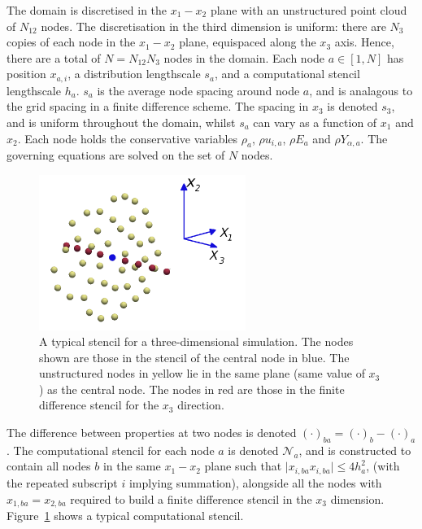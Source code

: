\documentclass[notitlepage]{revtex4-1}
\begin{document}
The domain is discretised in the $x_{1}-x_{2}$ plane with an unstructured point cloud of $N_{12}$ nodes. The discretisation in the third dimension is uniform: there are $N_{3}$ copies of each node in the $x_{1}-x_{2}$ plane, equispaced along the $x_{3}$ axis. Hence, there are a total of $N=N_{12}N_{3}$ nodes in the domain. Each node $a\in\left[1,N\right]$ has position $x_{a,i}$, a distribution lengthscale $s_{a}$, and a computational stencil lengthscale $h_{a}$. $s_{a}$ is the average node spacing around node $a$, and is analagous to the grid spacing in a finite difference scheme. The spacing in $x_{3}$ is denoted $s_{3}$, and is uniform throughout the domain, whilst $s_{a}$ can vary as a function of $x_{1}$ and $x_{2}$. Each node holds the conservative variables $\rho_{a}$, $\rho{u}_{i,a}$, $\rho{E}_{a}$ and $\rho{Y}_{\alpha,a}$. The governing equations are solved on the set of $N$ nodes. 

\begin{figure}
\includegraphics[width=0.6\textwidth]{./stencil.png}
\caption{A typical stencil for a three-dimensional simulation. The nodes shown are those in the stencil of the central node in blue. The unstructured nodes in yellow lie in the same plane (same value of $x_{3}$) as the central node. The nodes in red are those in the finite difference stencil for the $x_{3}$ direction.\label{fig:disc2}}
\end{figure}

The difference between properties at two nodes is denoted $\left(\cdot\right)_{ba}=\left(\cdot\right)_{b}-\left(\cdot\right)_{a}$. The computational stencil for each node $a$ is denoted $\mathcal{N}_{a}$, and is constructed to contain all nodes $b$ in the same $x_{1}-x_{2}$ plane such that $\lvert{x}_{i,ba}x_{i,ba}\rvert\le4h_{a}^{2}$, (with the repeated subscript $i$ implying summation), alongside all the nodes with $x_{1,ba}=x_{2,ba}$ required to build a finite difference stencil in the $x_{3}$ dimension. Figure~\ref{fig:disc2} shows a typical computational stencil.
\end{document}
